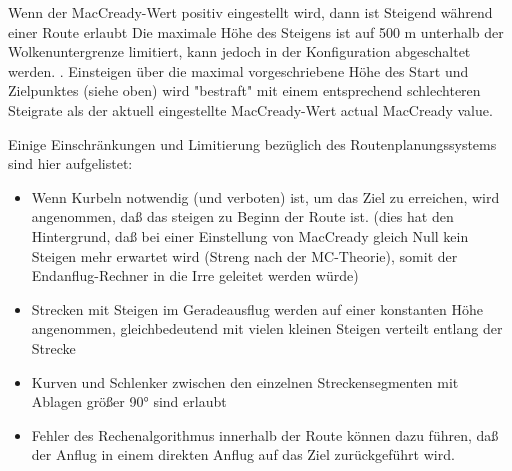 \warning
Wenn der MacCready-Wert positiv eingestellt wird, dann ist Steigend während einer Route erlaubt
  Die maximale Höhe des Steigens  ist auf  500 m unterhalb der Wolkenuntergrenze limitiert, kann jedoch in der Konfiguration abgeschaltet werden.
.
Einsteigen über die maximal vorgeschriebene Höhe des Start und Zielpunktes (siehe oben) wird "bestraft" mit einem entsprechend schlechteren Steigrate als der aktuell eingestellte MacCready-Wert
actual MacCready value.

Einige Einschränkungen und Limitierung bezüglich des Routenplanungssystems sind hier aufgelistet:

\begin{itemize}
\item Wenn Kurbeln notwendig (und verboten)  ist, um das Ziel zu erreichen,  wird angenommen, daß das steigen zu Beginn der Route ist. (dies hat den Hintergrund, daß bei einer Einstellung von  MacCready gleich Null kein Steigen mehr erwartet wird (Streng nach der MC-Theorie), somit der Endanflug-Rechner in die Irre geleitet werden würde) \halt
\item Strecken mit Steigen im Geradeausflug werden auf einer konstanten Höhe angenommen, gleichbedeutend mit vielen kleinen Steigen verteilt entlang der Strecke
\item Kurven und Schlenker zwischen den einzelnen Streckensegmenten mit Ablagen größer 90° sind erlaubt
\item Fehler des Rechenalgorithmus innerhalb der Route können dazu führen, daß der Anflug in einem direkten Anflug auf das Ziel zurückgeführt wird.
\end{itemize}

